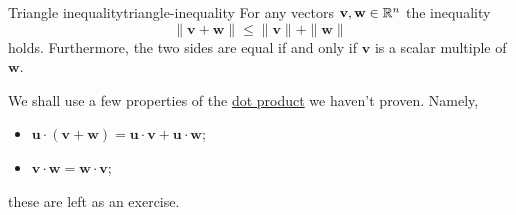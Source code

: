 \begin{theorem}{Triangle inequality}{triangle-inequality}
 For any vectors $\mathbf{v},\mathbf{w} \in \mathbb{R}^{n}$ the inequality
 \begin{equation}
  \label{eq:triangle-inequality}
  \|\mathbf{v} + \mathbf{w}\| \leq \|\mathbf{v}\| + \|\mathbf{w}\|
 \end{equation}
 holds. Furthermore, the two sides are equal if and only if $\mathbf{v}$ is a
 scalar multiple of $\mathbf{w}$.
\end{theorem}
\begin{thmproof}
 We shall use a few properties of the \hyperref[def:dot-product]{dot product} we
 haven't proven. Namely,
 \begin{itemize}
  \item $\mathbf{u} \cdot (\mathbf{v} + \mathbf{w}) = \mathbf{u} \cdot
   \mathbf{v} + \mathbf{u} \cdot \mathbf{w}$;
  \item $\mathbf{v} \cdot \mathbf{w} = \mathbf{w} \cdot \mathbf{v}$;
 \end{itemize}
 these are left as an exercise.


\end{thmproof}
